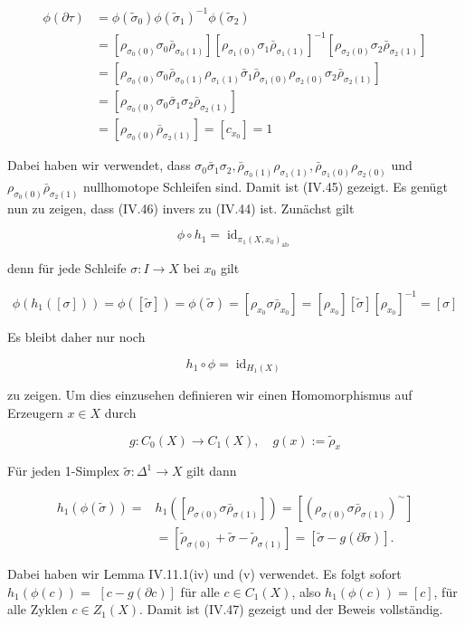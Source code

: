 \documentclass[10pt, letterpaper]{article}
\begin{document}
$$
\begin{aligned}
\phi(\partial \tau) & =\phi\left(\tilde{\sigma}_0\right) \phi\left(\tilde{\sigma}_1\right)^{-1} \phi\left(\tilde{\sigma}_2\right) \\
& =\left[\rho_{\sigma_0(0)} \sigma_0 \bar{\rho}_{\sigma_0(1)}\right]\left[\rho_{\sigma_1(0)} \sigma_1 \bar{\rho}_{\sigma_1(1)}\right]^{-1}\left[\rho_{\sigma_2(0)} \sigma_2 \bar{\rho}_{\sigma_2(1)}\right] \\
& =\left[\rho_{\sigma_0(0)} \sigma_0 \bar{\rho}_{\sigma_0(1)} \rho_{\sigma_1(1)} \bar{\sigma}_1 \bar{\rho}_{\sigma_1(0)} \rho_{\sigma_2(0)} \sigma_2 \bar{\rho}_{\sigma_2(1)}\right] \\
& =\left[\rho_{\sigma_0(0)} \sigma_0 \bar{\sigma}_1 \sigma_2 \bar{\rho}_{\sigma_2(1)}\right] \\
& =\left[\rho_{\sigma_0(0)} \bar{\rho}_{\sigma_2(1)}\right]=\left[c_{x_0}\right]=1
\end{aligned}
$$


Dabei haben wir verwendet, dass $\sigma_0 \bar{\sigma}_1 \sigma_2, \bar{\rho}_{\sigma_0(1)} \rho_{\sigma_1(1)}, \bar{\rho}_{\sigma_1(0)} \rho_{\sigma_2(0)}$ und $\rho_{\sigma_0(0)} \bar{\rho}_{\sigma_2(1)}$ nullhomotope Schleifen sind. Damit ist (IV.45) gezeigt. Es genügt nun zu zeigen, dass (IV.46) invers zu (IV.44) ist. Zunächst gilt

$$
\phi \circ h_1=\operatorname{id}_{\pi_1\left(X, x_0\right)_{\mathrm{ab}}}
$$

denn für jede Schleife $\sigma: I \rightarrow X$ bei $x_0$ gilt

$$
\phi\left(h_1([\sigma])\right)=\phi([\tilde{\sigma}])=\phi(\tilde{\sigma})=\left[\rho_{x_0} \sigma \bar{\rho}_{x_0}\right]=\left[\rho_{x_0}\right][\tilde{\sigma}]\left[\rho_{x_0}\right]^{-1}=[\sigma]
$$


Es bleibt daher nur noch

$$
h_1 \circ \phi=\operatorname{id}_{H_1(X)}
$$

zu zeigen. Um dies einzusehen definieren wir einen Homomorphismus auf Erzeugern $x \in X$ durch

$$
g: C_0(X) \rightarrow C_1(X), \quad g(x):=\tilde{\rho}_x
$$


Für jeden 1-Simplex $\tilde{\sigma}: \Delta^1 \rightarrow X$ gilt dann

$$
\begin{aligned}
h_1(\phi(\tilde{\sigma}))= & h_1\left(\left[\rho_{\sigma(0)} \sigma \bar{\rho}_{\sigma(1)}\right]\right)=\left[\left(\rho_{\sigma(0)} \sigma \bar{\rho}_{\sigma(1)}\right)^{\sim}\right] \\
& =\left[\tilde{\rho}_{\sigma(0)}+\tilde{\sigma}-\tilde{\rho}_{\sigma(1)}\right]=[\tilde{\sigma}-g(\partial \tilde{\sigma})] .
\end{aligned}
$$


Dabei haben wir Lemma IV.11.1(iv) und (v) verwendet. Es folgt sofort $h_1(\phi(c))=$ $[c-g(\partial c)]$ für alle $c \in C_1(X)$, also $h_1(\phi(c))=[c]$, für alle Zyklen $c \in Z_1(X)$. Damit ist (IV.47) gezeigt und der Beweis vollständig.








\pagebreak
\printbibliography
\end{document}
